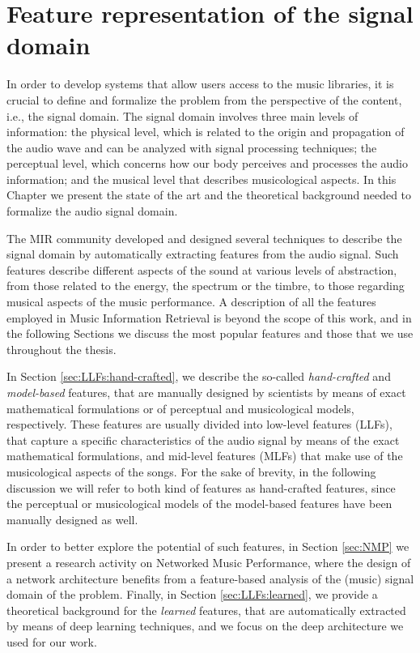 \chapter{Feature representation of the signal domain}
\label{Chap:LLFs}
In order to develop systems that allow users access to the music libraries, it is crucial to define and formalize the problem from the perspective of the content, i.e., the signal domain. The signal domain involves three main levels of information: the physical level, which is related to the origin and propagation of the audio wave and can be analyzed with signal processing techniques; the perceptual level, which concerns how our body perceives and processes the audio information; and the musical level that describes musicological aspects. In this Chapter we  present the state of the art and the theoretical background needed to formalize the audio signal domain.

The MIR community developed and designed several techniques to describe the signal domain by automatically extracting features from the audio signal. Such features describe different aspects of the sound at various levels of abstraction, from those related to the energy, the spectrum or the timbre, to those regarding musical aspects of the music performance. A description of all the features employed in Music Information Retrieval is beyond the scope of this work, and in the following Sections we discuss the most popular features and those that we use throughout the thesis.

In Section \ref{sec:LLFs:hand-crafted}, we describe the so-called \textit{hand-crafted} and \textit{model-based} features, that are manually designed by scientists by means of exact mathematical formulations or of perceptual and musicological models, respectively. These features are usually divided into low-level features (LLFs), that capture a specific characteristics of the audio signal by means of the exact mathematical formulations, and mid-level features (MLFs) that make use of the musicological aspects of the songs. For the sake of brevity, in the following discussion we will refer to both kind of features as hand-crafted features, since the perceptual or musicological models of the model-based features have been manually designed as well.

In order to better explore the potential of such features, in Section \ref{sec:NMP} we present a research activity on Networked Music Performance, where the design of a network architecture benefits from a feature-based analysis of the (music) signal domain of the problem.
Finally, in Section \ref{sec:LLFs:learned}, we provide a theoretical background for the \textit{learned} features, that are automatically extracted by means of deep learning techniques, and we focus on the deep architecture we used for our work. %


